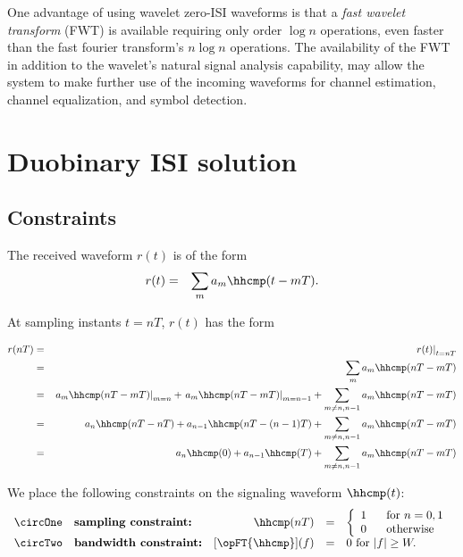One advantage of using wavelet zero-ISI waveforms is that a {\em fast wavelet transform}
(FWT) is available requiring only order $\log n$ operations,
even faster than the fast fourier transform's $n\log n$ operations.
The availability of the FWT in addition to the wavelet's natural
signal analysis capability, may allow the system to make further use of the
incoming waveforms for channel estimation, channel equalization, and
symbol detection.

\section{Duobinary ISI solution}
\label{sec:isi_duo}
\label{sec:duobinary}
\subsection{Constraints}
The received waveform $r(t)$ is of the form
\begin{eqnarray*}
   r(t) &=& \sum_m a_m \hhcmp(t-mT).
\end{eqnarray*}

At sampling instants $t=nT$, $r(t)$ has the form

\begin{eqnarray*}
   r(nT)
     &=& \left. r(t)                               \right|_{t=nT}
   \\&=& \sum_m a_m \hhcmp(nT-mT)
   \\&=& \left. a_m\hhcmp(nT-mT)\right|_{m=n}     +
         \left. a_m\hhcmp(nT-mT)\right|_{m=n-1}   +
         \sum_{m\ne n,n-1} a_m \hhcmp(nT-mT)
   \\&=& a_n\hhcmp(nT-nT) + a_{n-1}\hhcmp(nT-(n-1)T) + \sum_{m\ne n,n-1} a_m \hhcmp(nT-mT)
   \\&=& a_n\hhcmp(0) +
         a_{n-1}\hhcmp(T) +
         \sum_{m\ne n,n-1} a_m \hhcmp(nT-mT)
\end{eqnarray*}

We place the following constraints on the signaling waveform $\hhcmp(t)$:
\[
\begin{array}{llrcl}
   \circOne & \mbox{\bf sampling constraint:}
      & \hhcmp(nT) &=&
          \left\{\begin{array}{l@{\hspace{4ex}}l}
            1 &   \mbox{for } n=0,1 \\
            0 &   \mbox{otherwise}
          \end{array}\right.
\\
   \circTwo & \mbox{\bf bandwidth constraint:}
      & [\opFT{\hhcmp}](f) &=& 0 \mbox{ for } |f|\ge W.
\end{array}
\]

